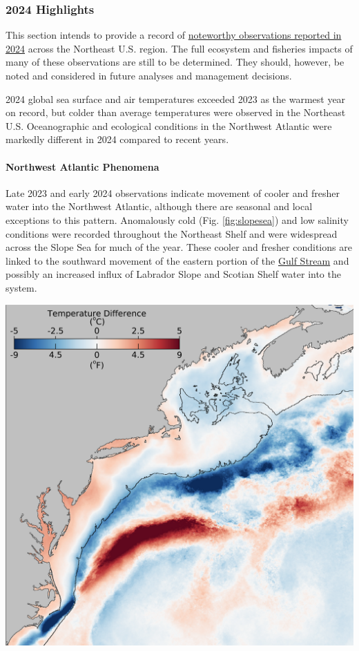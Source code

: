 \documentclass[
  10pt,
]{article}
\let\origfigure\figure
\let\endorigfigure\endfigure
\renewenvironment{figure}[1][2] {
    \expandafter\origfigure\expandafter[H]
} {
    \endorigfigure
}
\begin{document}
\subsubsection{2024 Highlights}\label{highlights}

This section intends to provide a record of \href{https://noaa-edab.github.io/catalog/observation_synthesis_2024.html}{noteworthy observations reported in 2024} across the Northeast U.S. region. The full ecosystem and fisheries impacts of many of these observations are still to be determined. They should, however, be noted and considered in future analyses and management decisions.

2024 global sea surface and air temperatures exceeded 2023 as the warmest year on record, but colder than average temperatures were observed in the Northeast U.S. Oceanographic and ecological conditions in the Northwest Atlantic were markedly different in 2024 compared to recent years.

\paragraph{Northwest Atlantic Phenomena}\label{northwest-atlantic-phenomena}

Late 2023 and early 2024 observations indicate movement of cooler and fresher water into the Northwest Atlantic, although there are seasonal and local exceptions to this pattern. Anomalously cold (Fig. \ref{fig:slopesea}) and low salinity conditions were recorded throughout the Northeast Shelf and were widespread across the Slope Sea for much of the year. These cooler and fresher conditions are linked to the southward movement of the eastern portion of the \href{https://noaa-edab.github.io/catalog/gsi.html}{Gulf Stream} and possibly an increased influx of Labrador Slope and Scotian Shelf water into the system.

\begin{figure}

{\centering \includegraphics[width=0.65\linewidth]{midatlantic_files/figure-latex/slopesea-1} 

}

\caption{February 2024 sea surface temperature difference compared to the February 2000-2020 long-term mean from the NOAA Advanced Clear-Sky Processor for Ocean (ACSPO) Super-collated SST.}\label{fig:slopesea}
\end{figure}
\end{document}
